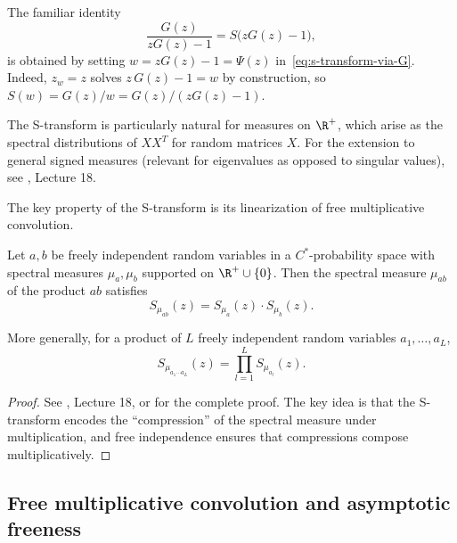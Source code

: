 \begin{remark}
The familiar identity
\[
\frac{G(z)}{zG(z)-1} = S\bigl(zG(z)-1\bigr),
\]
is obtained by setting $w = zG(z) - 1 = \Psi(z)$ in~\eqref{eq:s-transform-via-G}. Indeed, $z_w = z$ solves $z\,G(z) - 1 = w$ by construction, so $S(w) = G(z)/w = G(z)/(zG(z)-1)$.
\end{remark}

\begin{remark}
The S-transform is particularly natural for measures on $\R^+$, which arise as the spectral distributions of $XX^T$ for random matrices $X$. For the extension to general signed measures (relevant for eigenvalues as opposed to singular values), see \cite{nica2006lectures}, Lecture 18.
\end{remark}

The key property of the S-transform is its linearization of free multiplicative convolution.

\begin{theorem}\label{thm:s-linearization}
Let $a, b$ be freely independent random variables in a $C^*$-probability space with spectral measures $\mu_a, \mu_b$ supported on $\R^+ \cup \{0\}$. Then the spectral measure $\mu_{ab}$ of the product $ab$ satisfies
\begin{equation}\label{eq:s-multiplicative}
S_{\mu_{ab}}(z) = S_{\mu_a}(z) \cdot S_{\mu_b}(z).
\end{equation}

More generally, for a product of $L$ freely independent random variables $a_1, \ldots, a_L$,
\begin{equation}
S_{\mu_{a_1 \cdots a_L}}(z) = \prod_{l=1}^L S_{\mu_{a_l}}(z).
\end{equation}
\end{theorem}

\begin{proof}
See \cite{nica2006lectures}, Lecture 18, or \cite{voiculescu1992free} for the complete proof. The key idea is that the S-transform encodes the ``compression'' of the spectral measure under multiplication, and free independence ensures that compressions compose multiplicatively.
\end{proof}

\subsection{Free multiplicative convolution and asymptotic freeness}

